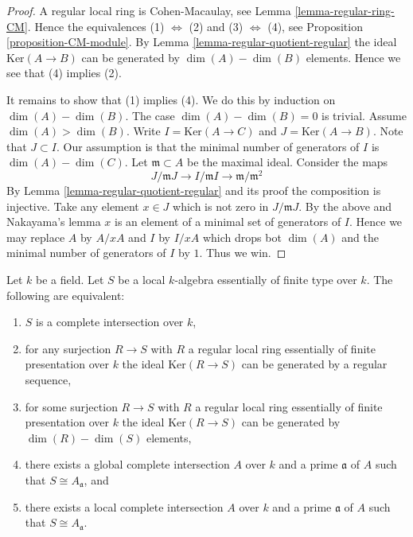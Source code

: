\begin{proof}
A regular local ring is Cohen-Macaulay, see Lemma \ref{lemma-regular-ring-CM}.
Hence the equivalences (1) $\Leftrightarrow$ (2) and
(3) $\Leftrightarrow$ (4), see Proposition \ref{proposition-CM-module}.
By Lemma \ref{lemma-regular-quotient-regular}
the ideal $\text{Ker}(A \to B)$ can be generated
by $\dim(A) - \dim(B)$ elements.
Hence we see that (4) implies (2).

\medskip\noindent
It remains to show that (1) implies (4). We do this by induction on
$\dim(A) - \dim(B)$. The case $\dim(A) - \dim(B) = 0$ is trivial.
Assume $\dim(A) > \dim (B)$.
Write $I = \text{Ker}(A \to C)$ and $J = \text{Ker}(A \to B)$.
Note that $J \subset I$. Our assumption is that the minimal number
of generators of $I$ is $\dim(A) - \dim(C)$.
Let $\mathfrak m \subset A$ be the maximal
ideal. Consider the maps
$$
J/ \mathfrak m J \to  I / \mathfrak m I \to \mathfrak m /\mathfrak m^2
$$
By Lemma \ref{lemma-regular-quotient-regular} and its proof the
composition is injective. Take any element $x \in J$ which is
not zero in $J /\mathfrak mJ$. By the above and Nakayama's lemma
$x$ is an element of a minimal set of generators of $I$.
Hence we may replace $A$ by $A/xA$ and $I$ by $I/xA$ which
drops bot $\dim(A)$ and the minimal number of generators of $I$
by $1$. Thus we win.
\end{proof}

\begin{lemma}
\label{lemma-lci-local}
Let $k$ be a field. Let $S$ be a local $k$-algebra essentially of finite
type over $k$. The following are equivalent:
\begin{enumerate}
\item $S$ is a complete intersection over $k$,
\item for any surjection $R \to S$ with $R$ a regular local ring
essentially of finite presentation over $k$ the ideal
$\text{Ker}(R \to S)$ can be generated by a regular sequence,
\item for some surjection $R \to S$ with $R$ a regular local ring
essentially of finite presentation over $k$ the ideal
$\text{Ker}(R \to S)$ can be generated by
$\dim(R) - \dim(S)$ elements,
\item there exists a global complete intersection
$A$ over $k$ and a prime $\mathfrak a$ of $A$ such
that $S \cong A_{\mathfrak a}$, and
\item there exists a local complete intersection
$A$ over $k$ and a prime $\mathfrak a$ of $A$ such
that $S \cong A_{\mathfrak a}$.
\end{enumerate}
\end{lemma}

